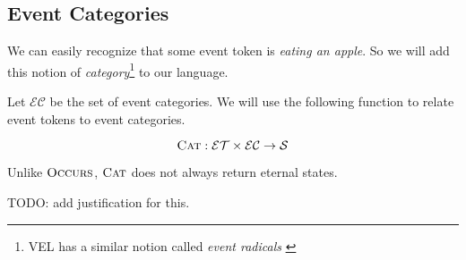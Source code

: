 \subsection{Event Categories}
We can easily recognize that some event token is \textit{eating an apple}. So we will add this notion of \textit{category}\footnote{VEL has a similar notion called \textit{event radicals} \cite{bennett2001unifying}} to our language.

Let $\mathcal{EC}$ be the set of event categories. We will use the following function to relate event tokens to event categories.

\[
    \textsc{Cat}: \mathcal{ET} \times \mathcal{EC} \to \mathcal{S}
\]

Unlike $\textsc{Occurs}$, $\textsc{Cat}$ does not always return eternal states. 

TODO: add justification for this.


